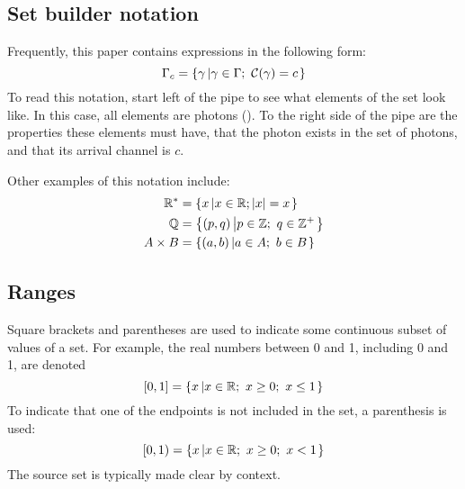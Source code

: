 \begin{appendix}
\subsection{Set builder notation}
Frequently, this paper contains expressions in the following form:
\begin{equation}
\Gamma_{c}=\left\lbrace \gamma\left|\gamma\in\Gamma;~\mathcal{C}(\gamma)=c\right. \right\rbrace
\end{equation}
To read this notation, start left of the pipe to see what elements of the set look like. In this case, all elements are photons (\photon). To the right side of the pipe are the properties these elements must have, that the photon exists in the set \photons{} of photons, and that its arrival channel is $c$. 

Other examples of this notation include:
\begin{align}
\mathbb{R}^{*} &= \left\lbrace x \left| x\in\mathbb{R}; \left|x\right|=x \right. \right\rbrace \\
\mathbb{Q} &= \left\lbrace (p,q) \left| p\in\mathbb{Z};~q\in\mathbb{Z}^{+} \right. \right\rbrace \\
A\times B &= \left\lbrace (a,b) \left| a\in A;~b\in B \right. \right\rbrace                       
\end{align}

\subsection{Ranges}
Square brackets and parentheses are used to indicate some continuous subset of values of a set. For example, the real numbers between 0 and 1, including 0 and 1, are denoted
\begin{equation}
\left[ 0,1 \right] = \left\lbrace x \left| x\in\mathbb{R};~x\ge 0;~x\le 1 \right. \right\rbrace
\end{equation}
To indicate that one of the endpoints is not included in the set, a parenthesis is used:
\begin{equation}
\left[0,1\right) = \left\lbrace x \left| x\in\mathbb{R};~x\ge 0;~x<1 \right. \right\rbrace
\end{equation}
The source set is typically made clear by context.


\end{appendix}
